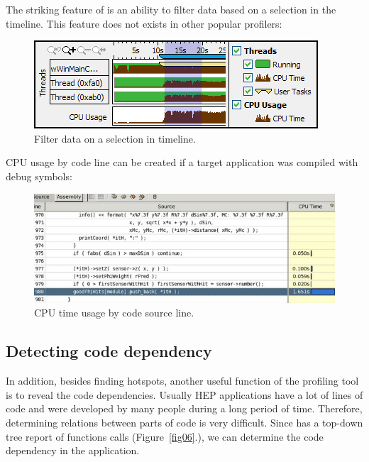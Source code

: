 \documentclass[a4paper]{jpconf}
\begin{document}
The striking feature of \amp is an ability to filter data based on a selection in the timeline. This feature does not exists in other popular profilers:

\begin{figure}[H]
\begin{minipage}{\textwidth}
\includegraphics[]{figs/fig04.png}
\caption{\label{fig04}Filter data on a selection in timeline.}
\end{minipage}
\end{figure}

CPU usage by code line can be created if a target application was compiled with debug symbols:

\begin{figure}[H]
\begin{minipage}{\textwidth}
\includegraphics[width=\textwidth]{figs/fig05.png}
\caption{\label{fig05}CPU time usage by code source line.}
\end{minipage}
\end{figure}

\subsection{Detecting code dependency}

In addition, besides finding hotspots, another useful function of the profiling tool is to reveal the code dependencies. Usually HEP applications have a lot of lines of code and were developed by many people during a long period of time. Therefore, determining relations between parts of code is very difficult. Since \amp  has a top-down tree report of  functions calls (Figure~\ref{fig06}.),  we can determine the code dependency in the application.
\end{document}
